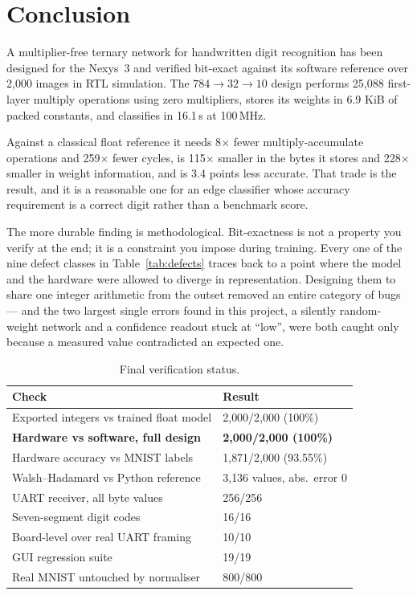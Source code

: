 \documentclass[11pt,a4paper]{article}
\begin{document}
\section{Conclusion}

A multiplier-free ternary network for handwritten digit recognition has been
designed for the Nexys~3 and verified bit-exact against its software reference
over 2{,}000 images in RTL simulation. The $784 \rightarrow 32 \rightarrow 10$ design performs
25{,}088 first-layer multiply operations using zero multipliers, stores its
weights in 6.9 KiB of packed constants, and classifies in 16.1\,\textmu s at 100\,MHz.

Against a classical float reference it needs 8$\times$ fewer multiply-accumulate
operations and 259$\times$ fewer cycles, is 115$\times$ smaller in the bytes it
stores and 228$\times$ smaller in weight information, and is 3.4 points less
accurate. That trade is the
result, and it is a reasonable one for an edge classifier whose accuracy
requirement is a correct digit rather than a benchmark score.

The more durable finding is methodological. Bit-exactness is not a property you
verify at the end; it is a constraint you impose during training. Every one of
the nine defect classes in Table~\ref{tab:defects} traces back to a point where
the model and the hardware were allowed to diverge in representation. Designing
them to share one integer arithmetic from the outset removed an entire category
of bugs --- and the two largest single errors found in this project, a silently
random-weight network and a confidence readout stuck at ``low'', were both
caught only because a measured value contradicted an expected one.

\begin{table}[H]
\centering
\small
\caption{Final verification status.}
\begin{tabularx}{\linewidth}{@{}lY@{}}
\toprule
\textbf{Check} & \textbf{Result} \\
\midrule
Exported integers vs trained float model & 2{,}000/2{,}000 (100\%) \\
\textbf{Hardware vs software, full design} & \textbf{2{,}000/2{,}000 (100\%)} \\
Hardware accuracy vs MNIST labels        & 1{,}871/2{,}000 (93.55\%) \\
Walsh--Hadamard vs Python reference      & 3{,}136 values, abs.\ error 0 \\
UART receiver, all byte values           & 256/256 \\
Seven-segment digit codes                & 16/16 \\
Board-level over real UART framing       & 10/10 \\
GUI regression suite                     & 19/19 \\
Real MNIST untouched by normaliser       & 800/800 \\
\bottomrule
\end{tabularx}
\end{table}
\end{document}
